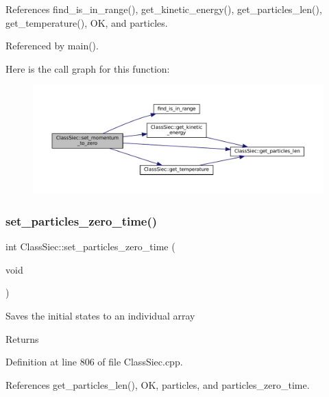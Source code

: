 References find\+\_\+is\+\_\+in\+\_\+range(), get\+\_\+kinetic\+\_\+energy(), get\+\_\+particles\+\_\+len(), get\+\_\+temperature(), OK, and particles.



Referenced by main().

Here is the call graph for this function\+:
\nopagebreak
\begin{figure}[H]
\begin{center}
\leavevmode
\includegraphics[width=350pt]{classClassSiec_ab2a445e522e2d8c59177fd28c074c1c1_cgraph}
\end{center}
\end{figure}
\mbox{\label{classClassSiec_a37811fccdbeb4119061a02cfb9386677}} 
\subsubsection{\texorpdfstring{set\+\_\+particles\+\_\+zero\+\_\+time()}{set\_particles\_zero\_time()}}
{\footnotesize\ttfamily int Class\+Siec\+::set\+\_\+particles\+\_\+zero\+\_\+time (\begin{DoxyParamCaption}\item[{void}]{ }\end{DoxyParamCaption})}

Saves the initial states to an individual array \begin{DoxyReturn}{Returns}

\end{DoxyReturn}


Definition at line 806 of file Class\+Siec.\+cpp.



References get\+\_\+particles\+\_\+len(), OK, particles, and particles\+\_\+zero\+\_\+time.



